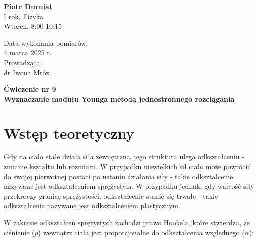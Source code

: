 \documentclass[a4paper,12pt]{article}
\begin{document}
\noindent
\begin{minipage}{0.5\textwidth}
    \raggedright
    \textbf{Piotr Durniat} \\
    I rok, Fizyka \\
    Wtorek, 8:00-10:15 \\
    \vspace{0.5cm}
    \vspace{0.5cm}
\end{minipage}%
\begin{minipage}{0.5\textwidth}
    \raggedleft
    Data wykonania pomiarów: \\
    4 marca 2025 r. \\
    \vspace{0.5cm} %
    Prowadząca: \\
    dr Iwona Mróz
\end{minipage}

\vspace{2cm} %
\begin{center}
    \LARGE \textbf{Ćwiczenie nr 9} \\[0.5cm]
    \Large \textbf{Wyznaczanie modułu Younga metodą jednostronnego rozciągania}
\end{center}

\vspace{1cm} %
\noindent

\tableofcontents
\newpage

\section{Wstęp teoretyczny}


Gdy na ciało stałe działa siła zewnętrzna, jego struktura ulega odkształceniu - zmianie kształtu lub rozmiaru. W przypadku niewielkich sił ciało może powrócić do swojej pierwotnej postaci po ustaniu działania siły - takie odkształcenie nazywane jest odkształceniem sprężystym. W przypadku jednak, gdy wartość siły przekroczy granicę sprężystości, odkształcenie stanie się trwałe - takie odkształcenie nazywane jest odkształceniem plastycznym.


W zakresie odkształceń sprężystych zachodzi prawo Hooke'a, które stwierdza, że ciśnienie ($p$) wewnątrz ciała jest proporcjonalne do odkształcenia względnego ($\alpha$):
\end{document}
